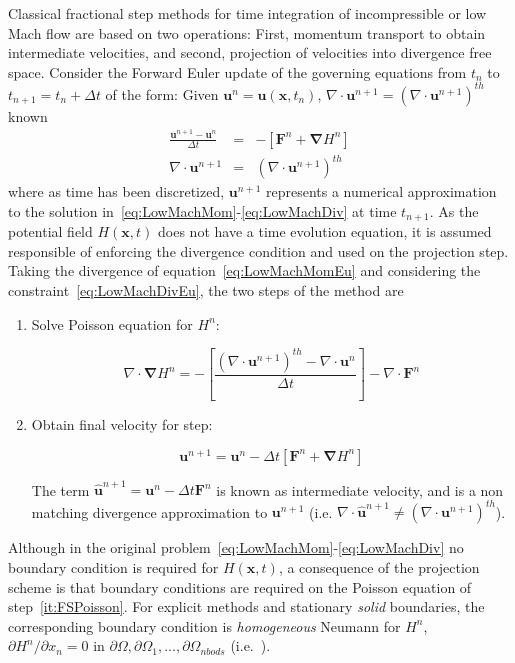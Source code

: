 Classical fractional step methods for time integration of incompressible or low Mach flow are based on two operations: First, momentum transport to obtain intermediate velocities, and second, projection of velocities into divergence free space. Consider the Forward Euler update of the governing equations from $t_n$ to $t_{n+1}=t_n + \Delta t$ of the form: Given $ \mathbf{u}^n=\mathbf{u}(\mathbf{x},t_n)$, $\nabla \cdot \mathbf{u}^{n+1} = \left( \nabla \cdot \mathbf{u}^{n+1} \right)^{th}$ known
%
\begin{eqnarray}
  \frac{\mathbf{u}^{n+1}-\mathbf{u}^{n}}{\Delta t} &=& - \left[ \mathbf{F}^n +  \boldsymbol{\nabla} H^n \right] \label{eq:LowMachMomEu}\\
  \nabla \cdot \mathbf{u}^{n+1} &=& \left( \nabla \cdot \mathbf{u}^{n+1} \right)^{th} \label{eq:LowMachDivEu}
\end{eqnarray}
%
where as time has been discretized, $\mathbf{u}^{n+1}$ represents a numerical approximation to the solution in~\eqref{eq:LowMachMom}-\eqref{eq:LowMachDiv} at time $t_{n+1}$. As the potential field $H(\mathbf{x},t)$ does not have a time evolution equation, it is assumed responsible of enforcing the divergence condition and used on the projection step. Taking the divergence of equation~\eqref{eq:LowMachMomEu} and considering  the constraint~\eqref{eq:LowMachDivEu}, the two steps of the method are
%
\begin{enumerate}
  \item Solve Poisson equation for $H^n$:

\begin{equation}
   \nabla \cdot \boldsymbol{\nabla} H^n = - \left[ \frac{\left( \nabla \cdot \mathbf{u}^{n+1} \right)^{th} - \nabla \cdot \mathbf{u}^{n}}{\Delta t} \right] - \nabla \cdot \mathbf{F}^n \label{it:FSPoisson}
\end{equation}

  \item Obtain final velocity for step:

  \begin{equation}
     \mathbf{u}^{n+1} = \mathbf{u}^{n} - \Delta t \left[ \mathbf{F}^n +  \boldsymbol{\nabla} H^n \right] \label{it:FSProject}
   \end{equation}

   The term $\hat{\mathbf{u}}^{n+1}=\mathbf{u}^{n} - \Delta t \mathbf{F}^n$ is known as intermediate velocity, and is a non matching divergence approximation to $\mathbf{u}^{n+1}$ (i.e. $\nabla \cdot \hat{\mathbf{u}}^{n+1} \neq \left( \nabla \cdot \mathbf{u}^{n+1} \right)^{th}$).
\end{enumerate}
%
Although in the original problem~\eqref{eq:LowMachMom}-\eqref{eq:LowMachDiv} no boundary condition is required for $H(\mathbf{x},t)$, a consequence of the projection scheme is that boundary conditions are required on the Poisson equation of step~\eqref{it:FSPoisson}. For explicit methods and stationary \textit{solid} boundaries, the corresponding boundary condition is \textit{homogeneous} Neumann for $H^n$, $\partial H^n / \partial x_n =0$ in $\partial \Omega,\partial \Omega_1,...,\partial \Omega_{nbods}$ (i.e.~\cite{Perot:1993}).



